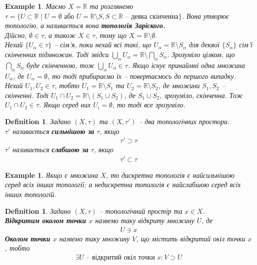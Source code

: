 \documentclass[a4paper, 10pt]{article}
\theoremstyle{theoremdd}
\newtheorem{definition}[theorem]{Definition}
\newtheorem{example}[theorem]{Example}
\begin{document}
\begin{example}
Маємо $X = \mathbb{R}$ та розглянемо $\tau = \{U \subset \mathbb{R} \mid U = \emptyset \text{ або } U = \mathbb{R} \setminus S, S \subset \mathbb{R} \text{ -- деяка скінченна}\}$. Вона утворює топологію, а називається вона \textbf{топологія Заріского.}\\
Дійсно, $\emptyset \in \tau$, а також $X \in \tau$, тому що $X = \mathbb{R} \setminus \emptyset$.\\
Нехай $\{U_\alpha \in \tau\}$ -- сім'я, поки нехай всі такі, що $U_\alpha = \mathbb{R} \setminus S_\alpha$ для декяої $\{S_\alpha\}$ сім'ї скінченних підмножин. Тоді звідси $\displaystyle\bigcup_\alpha U_\alpha = \mathbb{R} \setminus \bigcap_\alpha S_\alpha$. Зрозуміло цілком, що $\displaystyle\bigcap_\alpha S_\alpha$ буде скінченною, тож $\displaystyle\bigcup_\alpha U_\alpha \in \tau$. Якщо існує принаймні одна множина $U_\alpha$, де $U_\alpha = \emptyset$, то тоді прибираємо їх -- повертаємось до першого випадку.\\
Нехай $U_1,U_2 \in \tau$, тобто $U_1 = \mathbb{R} \setminus S_1$ та $U_2 = \mathbb{R} \setminus S_2$, де множини $S_1,S_2$ -- скінченні. Тоді $U_1 \cap U_2 = \mathbb{R} \setminus (S_1 \cup S_2)$, де $S_1 \cup S_2$, зрозуміло, скінченна. Тож $U_1 \cap U_2 \in \tau$. Якщо серед них $U_i = \emptyset$, то тоді все зрозуміло.
\end{example}

\begin{definition}
Задано $(X,\tau)$ та $(X,\tau')$ -- два топологічних простори.\\
$\tau'$ називається \textbf{сильнішою за} $\tau$, якщо
\begin{align*}
\tau' \supset \tau
\end{align*}
$\tau'$ називається \textbf{слабшою за} $\tau$, якщо
\begin{align*}
\tau' \subset \tau
\end{align*}
\end{definition}

\begin{example}
Якщо є множина $X$, то дискретна топологія є найсильнішою серед всіх інших топології; а недискретна топологія є найслабшою серед всіх інших топологій.
\end{example}

\begin{definition}
Задано $(X,\tau)$ -- топологічний простір та $x \in X$.\\
\textbf{Відкритим околом точки $x$} назвемо таку відкриту множину $U$, де
\begin{align*}
U \ni x
\end{align*}
\textbf{Околом точки $x$} назвемо таку множину $V$, що містить відкритий окіл точки $x$, тобто
\begin{align*}
\exists U \text{ -- відкритий окіл точки } x: V \supset U
\end{align*}
\end{definition}
\end{document}
